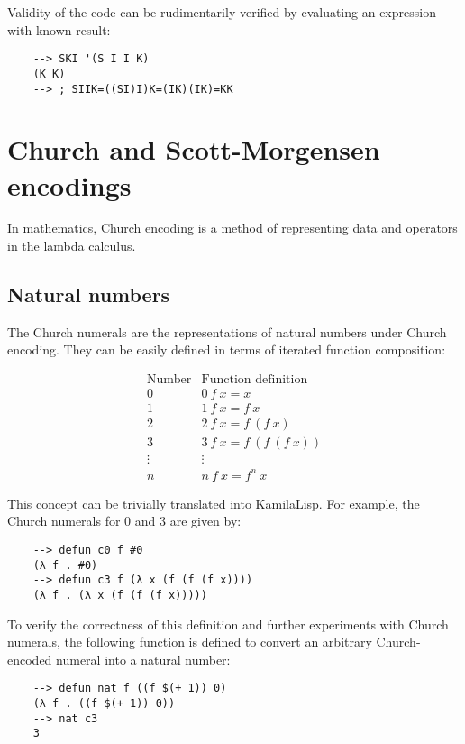 Validity of the code can be rudimentarily verified by evaluating an expression with known result:

\begin{Verbatim}
    --> SKI '(S I I K)
    (K K)
    --> ; SIIK=((SI)I)K=(IK)(IK)=KK
\end{Verbatim}

\section{Church and Scott-Morgensen encodings}

In mathematics, Church encoding is a method of representing data and operators in the lambda calculus.

\subsection{Natural numbers}

The Church numerals are the representations of natural numbers under Church encoding. They can be easily defined in terms of iterated function composition:

$$
\begin{array}{r|l}
    {\text{Number}}&{\text{Function definition}}\\
    \hline
    0&0\ f\ x=x\\
    1&1\ f\ x=f\ x\\
    2&2\ f\ x=f\ (f\ x)\\
    3&3\ f\ x=f\ (f\ (f\ x))\\
    \vdots&\vdots \\
    n&n\ f\ x=f^{n}\ x
\end{array}
$$

This concept can be trivially translated into KamilaLisp. For example, the Church numerals for 0 and 3 are given by:

\begin{Verbatim}
    --> defun c0 f #0
    (λ f . #0)
    --> defun c3 f (λ x (f (f (f x))))
    (λ f . (λ x (f (f (f x)))))
\end{Verbatim}

To verify the correctness of this definition and further experiments with Church numerals, the following function is defined to convert an arbitrary Church-encoded numeral into a natural number:

\begin{Verbatim}
    --> defun nat f ((f $(+ 1)) 0)
    (λ f . ((f $(+ 1)) 0))
    --> nat c3
    3
\end{Verbatim}

